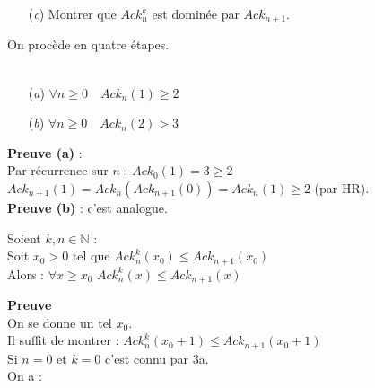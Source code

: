 \documentclass[12pt,letterpaper,boxed]{hmcpset}
\begin{document}
\begin{solution}
\begin{solution}[(b)]
\begin{itemize}
\end{itemize}


\end{solution}

\begin{problem}
\begin{itemize}  
  \item[(\textit{c})]  Montrer que $Ack^{k}_{n}$ est dominée par $Ack_{n+1}$.
 \end{itemize}

\end{problem}



\begin{solution}[(c)]

On procède en quatre étapes. \\ \\
\begin{problem}[Lemme 0]
\begin{itemize}
  \item[(\textit{a})] $ \forall n \geq 0 \quad Ack_{n}(1) \geq 2 $
  \item[(\textit{b})] $  \forall n \geq 0 \quad Ack_{n}(2) > 3 $
\end{itemize}
\end{problem}

\begin{solution}
\noindent \textbf{Preuve (a)} : \\
Par récurrence sur $n$ : $Ack_{0}(1) = 3 \geq 2 $ \\
$Ack_{n+1}(1) = Ack_{n}(Ack_{n+1}(0)) = Ack_{n}(1) \geq 2$ (par HR). \\
\noindent \textbf{Preuve (b)} : c'est analogue. 
\end{solution}


\newpage

\begin{problem}[Lemme 1]
Soient $k,n \in \mathbb{N}$ : \\
Soit $x_0 > 0$ tel que 
$Ack^{k}_{n}(x_{0}) \leq Ack_{n+1}(x_{0})$ \\
Alors : $ \forall x \geq x_{0} \, \, Ack^{k}_{n}(x) \leq Ack_{n+1}(x)  $
\end{problem}
\begin{solution}
\noindent \textbf{Preuve}\\
On se donne un tel $x_0$.\\
Il suffit de montrer : $ Ack^{k}_{n}(x_{0}+1) \leq Ack_{n+1}(x_{0}+1) $ \\
Si $n = 0$ et $k=0$ c'est connu par 3a. \\
On a : 


\end{solution}
\end{solution}
\end{solution}
\end{document}
